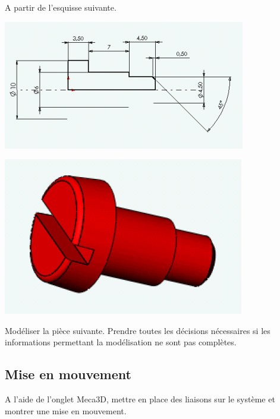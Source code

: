 \begin{minipage}{0.4\linewidth}
A partir de l'esquisse suivante.
\end{minipage}
\hfill
\begin{minipage}{0.58\linewidth}
\includegraphics[width=0.9\linewidth]{img/028}
\end{minipage}

\begin{minipage}{0.3\linewidth}
\includegraphics[width=0.8\linewidth]{img/027}
\end{minipage}
\hfill
\begin{minipage}{0.68\linewidth}
Modéliser la pièce suivante. Prendre toutes les décisions nécessaires si les informations permettant la modélisation ne sont pas complètes.
\end{minipage}

\subsection{Mise en mouvement}

A l'aide de l'onglet Meca3D, mettre en place des liaisons sur le système et montrer une mise en mouvement.

\newpage

